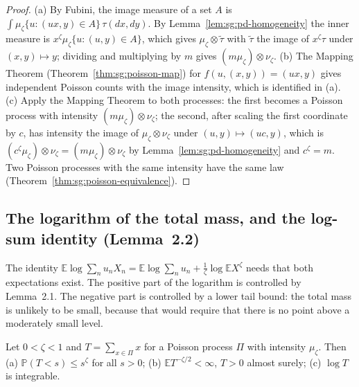 \begin{proof}
  \leanok
{}
(a) By Fubini, the image measure of a set $A$ is $\int \mu_\zeta\{u:(ux,y)\in A\}\,\tau(dx,dy)$. By Lemma~\ref{lem:sg:pd-homogeneity} the inner measure is $x^{\zeta}\mu_\zeta\{u:(u,y)\in A\}$, which gives $\mu_\zeta\otimes\tilde\tau$ with $\tilde\tau$ the image of $x^\zeta\tau$ under $(x,y)\mapsto y$; dividing and multiplying by $m$ gives $(m\mu_\zeta)\otimes\nu_\zeta$. (b) The Mapping Theorem (Theorem~\ref{thm:sg:poisson-map}) for $f(u,(x,y))=(ux,y)$ gives independent Poisson counts with the image intensity, which is identified in (a). (c) Apply the Mapping Theorem to both processes: the first becomes a Poisson process with intensity $(m\mu_\zeta)\otimes\nu_\zeta$; the second, after scaling the first coordinate by $c$, has intensity the image of $\mu_\zeta\otimes\nu_\zeta$ under $(u,y)\mapsto(uc,y)$, which is $(c^{\zeta}\mu_\zeta)\otimes\nu_\zeta=(m\mu_\zeta)\otimes\nu_\zeta$ by Lemma~\ref{lem:sg:pd-homogeneity} and $c^\zeta=m$. Two Poisson processes with the same intensity have the same law (Theorem~\ref{thm:sg:poisson-equivalence}).
\end{proof}

\subsection*{The logarithm of the total mass, and the log-sum identity (Lemma~2.2)}\label{sec:sg:pd-logsum}

The identity $\mathbb E\log\sum_nu_nX_n=\mathbb E\log\sum_nu_n+\frac1\zeta\log\mathbb EX^\zeta$ needs that both expectations exist. The positive part of the logarithm is controlled by Lemma~2.1. The negative part is controlled by a lower tail bound: the total mass is unlikely to be small, because that would require that there is no point above a moderately small level.

\begin{lemma}\label{lem:sg:pd-logint}
  \leanok
Let $0<\zeta<1$ and $T=\sum_{x\in\Pi}x$ for a Poisson process $\Pi$ with intensity $\mu_\zeta$. Then (a) $\mathbb P(T<s)\le s^{\zeta}$ for all $s>0$; (b) $\mathbb ET^{-\zeta/2}<\infty$, $T>0$ almost surely; (c) $\log T$ is integrable.
\end{lemma}

